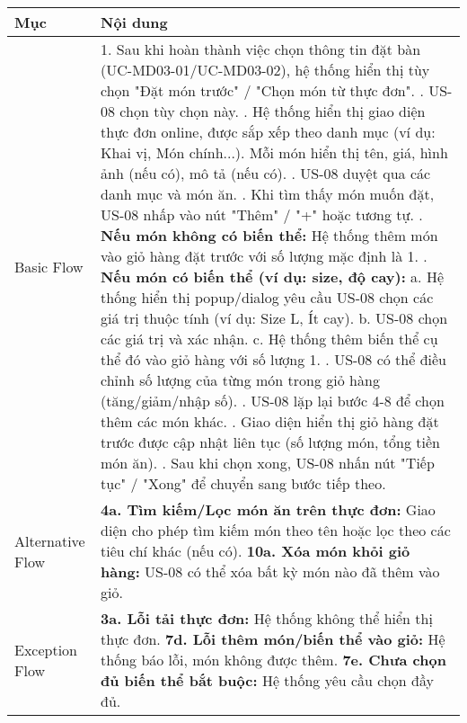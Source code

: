\begin{longtable}{|m{4cm}|p{11cm}|}
\hline
\textbf{Mục} & \textbf{Nội dung} \\
\hline
Basic Flow & 1. Sau khi hoàn thành việc chọn thông tin đặt bàn (UC-MD03-01/UC-MD03-02), hệ thống hiển thị tùy chọn "Đặt món trước" / "Chọn món từ thực đơn". \newline 2. US-08 chọn tùy chọn này. \newline 3. Hệ thống hiển thị giao diện thực đơn online, được sắp xếp theo danh mục (ví dụ: Khai vị, Món chính...). Mỗi món hiển thị tên, giá, hình ảnh (nếu có), mô tả (nếu có). \newline 4. US-08 duyệt qua các danh mục và món ăn. \newline 5. Khi tìm thấy món muốn đặt, US-08 nhấp vào nút "Thêm" / "+" hoặc tương tự. \newline 6. \textbf{Nếu món không có biến thể:} Hệ thống thêm món vào giỏ hàng đặt trước với số lượng mặc định là 1. \newline 7. \textbf{Nếu món có biến thể (ví dụ: size, độ cay):} \newline    a. Hệ thống hiển thị popup/dialog yêu cầu US-08 chọn các giá trị thuộc tính (ví dụ: Size L, Ít cay). \newline    b. US-08 chọn các giá trị và xác nhận. \newline    c. Hệ thống thêm biến thể cụ thể đó vào giỏ hàng với số lượng 1. \newline 8. US-08 có thể điều chỉnh số lượng của từng món trong giỏ hàng (tăng/giảm/nhập số). \newline 9. US-08 lặp lại bước 4-8 để chọn thêm các món khác. \newline 10. Giao diện hiển thị giỏ hàng đặt trước được cập nhật liên tục (số lượng món, tổng tiền món ăn). \newline 11. Sau khi chọn xong, US-08 nhấn nút "Tiếp tục" / "Xong" để chuyển sang bước tiếp theo. \\
\hline
Alternative Flow & \textbf{4a. Tìm kiếm/Lọc món ăn trên thực đơn:} Giao diện cho phép tìm kiếm món theo tên hoặc lọc theo các tiêu chí khác (nếu có). \newline \textbf{10a. Xóa món khỏi giỏ hàng:} US-08 có thể xóa bất kỳ món nào đã thêm vào giỏ. \\
\hline
Exception Flow & \textbf{3a. Lỗi tải thực đơn:} Hệ thống không thể hiển thị thực đơn. \newline \textbf{7d. Lỗi thêm món/biến thể vào giỏ:} Hệ thống báo lỗi, món không được thêm. \newline \textbf{7e. Chưa chọn đủ biến thể bắt buộc:} Hệ thống yêu cầu chọn đầy đủ. \\

\end{longtable}
